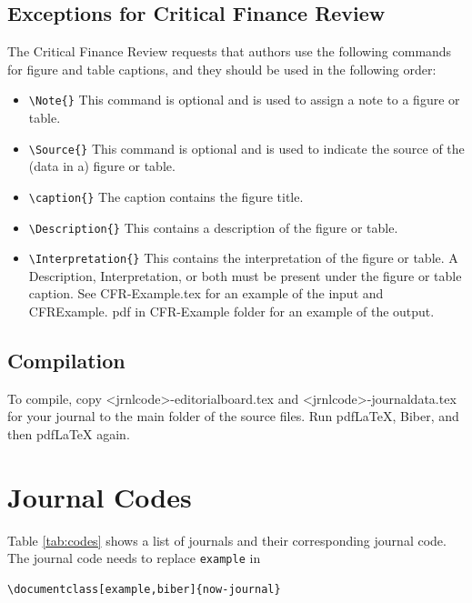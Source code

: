 \documentclass[example,biber]{now-journal} %
\begin{document}
\subsection{Exceptions for Critical Finance Review}
The Critical Finance Review requests that authors use the following commands for figure and table captions, and they should be used in the following order:

\begin{itemize}
\item \texttt{\textbackslash Note\{\}} This command is optional and is used to assign a note to a figure or table.
\item \texttt{\textbackslash Source\{\}} This command is optional and is used to indicate the source of the (data in a) figure or table.
\item \texttt{\textbackslash caption\{\}} The caption contains the figure title.
\item \texttt{\textbackslash Description\{\}} This contains a description of the figure or table.
\item \texttt{\textbackslash Interpretation\{\}} This contains the interpretation of the figure or table. A Description, Interpretation, or both must be present under the figure or table caption. See CFR-Example.tex for an example of the input and CFRExample. pdf in CFR-Example folder for an example of the output.
\end{itemize}

\subsection{Compilation}
\begin{sloppypar}
To compile, copy <jrnlcode>-editorialboard.tex and <jrnlcode>-journaldata.tex for your journal to the main folder of the source files. Run pdfLaTeX, Biber, and then pdfLaTeX again.
\end{sloppypar}

\appendix
\section{Journal Codes}
\label{s-journalcodes}

Table \ref{tab:codes} shows a list of journals and their corresponding journal code. The journal code needs to replace \texttt{example} in
\begin{verbatim}
\documentclass[example,biber]{now-journal}
\end{verbatim}
\end{document}
